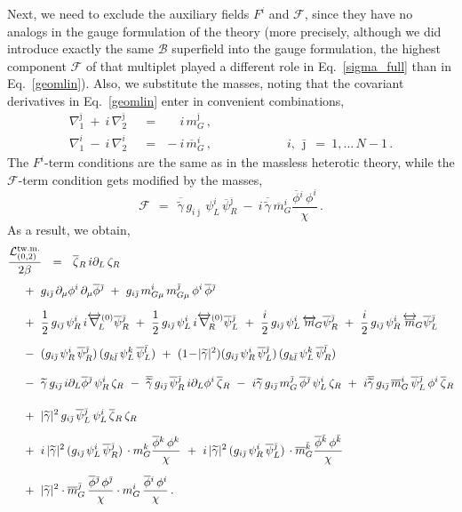 \documentclass[12pt]{article}
\def\beq{\begin{equation}}
\def\eeq{\end{equation}}
\newcommand{\p}{\partial}
\newcommand{\wt}{\widetilde}
\newcommand{\ov}{\overline}
\newcommand{\mc}[1]{\mathcal{#1}}
\newcommand{\bzr}{\ov{\zeta}{}_R}
\newcommand{\zr}{\zeta_R}
\newcommand{\tgamma}{\wt{\gamma}}
\newcommand{\btgamma}{\ov{\tgamma}}
\newcommand{\bpsi}{\ov{\psi}{}}
\newcommand{\bphi}{\ov{\phi}{}}
\newcommand{\ff}{\mc{F}}
\newcommand{\bj}{{\bar \jmath}}
\newcommand{\bk}{{\bar k}}
\newcommand{\bl}{{\bar l}}
\begin{document}
Next, we need to exclude the auxiliary fields $ F^i $ and $ \ff $, since they have no analogs
	in the gauge formulation of the theory 
	(more precisely, although we did introduce  exactly the same $\mc{B}$ superfield into the gauge formulation, 
	the highest component $\ff$ of that multiplet played a different role in Eq.~\eqref{sigma_full} than in Eq.~\eqref{geomlin}).
	Also, we substitute the masses, noting that the covariant derivatives in Eq.~\eqref{geomlin} 
	enter in convenient combinations, 
\begin{align*}
%
	\nabla_1^\bj ~+~ i\,\nabla_2^\bj & ~~=~~ \phantom{-} i\,m_G^\bj\,,    \\[2mm]
%
	\nabla_1^i ~-~ i\,\nabla_2^i     & ~~=~~ -i\,\ov{m}{}_G^i\,,
	\qquad\qquad\qquad i,\,\bj ~=~ 1,...\,N-1\,.
\end{align*}
The $ F^i $-term conditions are the same as in the massless heterotic theory, while the $ \ff $-term condition
	gets modified by the masses,
\beq
\label{ffterm}
	\ff ~~=~~ \btgamma\, g_{i\bj}\, \psi_L^i\, \bpsi_R^\bj
	      ~-~ i\, \btgamma\, \ov{m}_G^i \frac{\bphi^i\, \phi^i}{\chi}\,.
\eeq
	As a result, we obtain, 
\begin{align}
%
\notag
	\frac{\mc{L}_{(0,2)}^\text{tw.m.}}{2\beta} & ~~=~~ 
	\bzr\, i\p_L\, \zr \\[1mm]
%
\notag
	&\!\!\!\!\!\!\!\!\!\!\!\!
	~+~ g_{i\bj}\, \p_\mu\phi^i\, \p_\mu\bphi^\bj ~+~ g_{i\bj}\, m_{G\mu}^i\,m_{G\mu}^\bj\, \phi^i\, \bphi^\bj
	\\[2mm]
%
\notag
	&\!\!\!\!\!\!\!\!\!\!\!\!
	~+~ \frac{1}{2}\,g_{i\bj}\,\psi_R^i\,i\overleftrightarrow{\nabla}{}_{\!\!L}^{(0)} \bpsi_R^\bj 
	~+~ \frac{1}{2}\,g_{i\bj}\,\psi_L^i\,i\overleftrightarrow{\nabla}{}_{\!\!R}^{(0)} \bpsi_L^\bj 
	~+~ \frac{i}{2}\,g_{i\bj}\,\psi_L^i\, \overleftrightarrow{m}{}_{\!G} \bpsi_R^\bj
	~+~ \frac{i}{2}\,g_{i\bj}\,\psi_R^i\, \overleftrightarrow{\ov{m}}{}_{\!G} \bpsi_L^\bj
	\\[2mm]
%
\label{sgeom_phys}
	&\!\!\!\!\!\!\!\!\!\!\!\!
	~-~ (g_{i\bj}\, \psi_R^i\, \bpsi_R^\bj)\,(g_{k\bl}\, \psi_L^k\, \bpsi_L^\bl) 
	~+~ (1 \!-\!|\tgamma|^2)(g_{i\bj}\, \psi_R^i\, \bpsi_L^\bj)\,(g_{k\bl}\,\psi_L^k\,\bpsi_R^\bl)
	\\[3mm]
%
\notag
	&\!\!\!\!\!\!\!\!\!\!\!\!
	~-~ \tgamma\, g_{i\bj}\, i\p_L\bphi^\bj\, \psi_R^i\,\zr 
	~-~ \btgamma\, g_{i\bj}\, \bpsi_R^\bj\, i\p_L\phi^i\, \bzr
	~-~ i\tgamma\, g_{i\bj}\, m_G^\bj\,\bphi^\bj\, \psi_L^i\,\zr
	~+~ i\btgamma\, g_{i\bj}\,\ov{m}{}_G^i\, \bpsi_L^\bj\, \phi^i\,\bzr
	\\[4mm]
%
\notag
	&\!\!\!\!\!\!\!\!\!\!\!\!
	~+~ |\tgamma|^2\, g_{i\bj}\, \bpsi_L^\bj\, \psi_L^i\, \bzr\, \zr
	\\[2mm]
%
\notag
	&\!\!\!\!\!\!\!\!\!\!\!\!
	~+~ i\, |\tgamma|^2\, (g_{i\bj}\,\psi_L^i\,\bpsi_R^\bj)\, \cdot m_G^k \frac{\bphi^k\, \phi^k}{\chi}
	~+~ i\, |\tgamma|^2\, (g_{i\bj}\,\psi_R^i\,\bpsi_L^\bj)\, \cdot \ov{m}{}_G^\bk \frac{\bphi^\bk\,\phi^\bk}{\chi}
	\\[2mm]
%
\notag
	&\!\!\!\!\!\!\!\!\!\!\!\!
	~+~ |\tgamma|^2 \cdot \ov{m}{}_G^\bj\,\frac{\bphi^\bj\,\phi^\bj}{\chi}
			\cdot m_G^i\, \frac{\bphi^i\, \phi^i}{\chi}\,.
\end{align}
\end{document}
